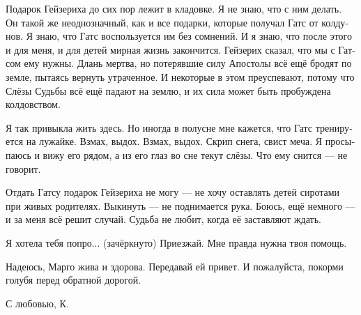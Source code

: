 \documentclass[a4paper,12pt,fleqn]{book}\usepackage{polyglossia}\setdefaultlanguage[babelshorthands=true]{russian}\setotherlanguage{english}\defaultfontfeatures{Ligatures=TeX,Mapping=tex-text}\usepackage{xcolor}\newcommand{\ml}[3]{#2}
\begin{document}
Подарок Гейзериха до сих пор лежит в кладовке.
Я не знаю, что с ним делать.
Он такой же неоднозначный, как и все подарки, которые получал Гатс от колдунов.
Я знаю, что Гатс воспользуется им без сомнений.
И я знаю, что после этого и для меня, и для детей мирная жизнь закончится.
Гейзерих сказал, что мы с Гатсом ему нужны.
Длань мертва, но потерявшие силу Апостолы всё ещё бродят по земле, пытаясь вернуть утраченное.
И некоторые в этом преуспевают, потому что Слёзы Судьбы всё ещё падают на землю, и их сила может быть пробуждена колдовством.

Я так привыкла жить здесь.
Но иногда в полусне мне кажется, что Гатс тренируется на лужайке.
Взмах, выдох. 
Взмах, выдох.
Скрип снега, свист меча.
Я просыпаюсь и вижу его рядом, а из его глаз во сне текут слёзы.
Что ему снится --- не говорит.

Отдать Гатсу подарок Гейзериха не могу --- не хочу оставлять детей сиротами при живых родителях.
Выкинуть --- не поднимается рука.
Боюсь, ещё немного --- и за меня всё решит случай.
Судьба не любит, когда её заставляют ждать.

Я хотела тебя попро... (зачёркнуто)
Приезжай.
Мне правда нужна твоя помощь.

Надеюсь, Марго жива и здорова.
Передавай ей привет.
И пожалуйста, покорми голубя перед обратной дорогой.

С любовью, К.
\end{document}
